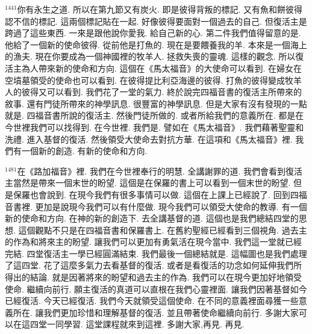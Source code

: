 \documentclass{book}
\begin{document}
$^{1441}$你有永生之道.
所以在第九節又有炭火.
即是彼得背叛的標記.
又有魚和餅彼得認不信的標記.
這兩個標記貼在一起.
好像彼得要面對一個過去的自己.
但復活主是跨過了這些東西.
一來是跟他說你愛我.
給自己新的心.
第二件我們值得留意的是.
他給了一個新的使命彼得.
從前他是打魚的.
現在是要餵養我的羊.
本來是一個海上的漁夫.
現在你要成為一個神國裡的牧羊人.
拯救失喪的靈魂.
這樣的觀念.
所以復活主為人帶來新的使命和方向.
這個在《馬太福音》的大使命可以看到.
在婦女在空墳墓領受的使命也可以看到.
在彼得提比利亞海邊的彼得.
打魚的彼得變成牧羊人的彼得又可以看到.
我們花了一堂的氣力.
終於說完四福音書的復活主所帶來的敘事.
還有門徒所帶來的神學訊息.
很豐富的神學訊息.
但是大家有沒有發現的一點就是.
四福音書所說的復活主.
然後門徒所做的.
或者所給我們的意義所在.
都是在今世裡我們可以找得到.
在今世裡.
我們是.
譬如在《馬太福音》.
我們藉著聖靈和洗禮.
進入基督的復活.
然後領受大使命去對抗方華.
在這項和《馬太福音》裡.
我們有一個新的創造.
有新的使命和方向.

$^{1481}$在《路加福音》裡.
我們在今世裡奉行的明慧.
全講謝罪的道.
我們會看到復活主當然是帶來一個末世的盼望.
這個是在保羅的書上可以看到一個末世的盼望.
但是保羅也會說到.
在現今我們有很多事情可以做.
這個在上課上已經說了.
回到四福音書裡.
更加是說現今我們可以有什麼做.
現今我們可以領受大使命的教導.
有一個新的使命和方向.
在神的新的創造下.
去全講基督的道.
這個也是我們總結四堂的思想.
這個觀點不只是在四福音書和保羅書上.
在舊約聖經已經看到三個視角.
過去主的作為和將來主的盼望.
讓我們可以更加有勇氣活在現今當中.
我們這一堂就已經完結.
四堂復活主一學已經圓滿結束.
我們最後一個總結就是.
這幅圖也是我們處理了這四堂.
花了這麼多氣力去看基督的復活.
或者是看復活的功念如何延伸我們所得出的結論.
就是因著將來的盼望和過去主的作為.
我們可以在現今更加好地領受使命.
繼續向前行.
願主復活的真道可以直根在我們心靈裡面.
讓我們因著基督如今已經復活.
今天已經復活.
我們今天就領受這個使命.
在不同的意義裡面尋獲一些意義所在.
讓我們更加珍惜和理解基督的復活.
並且帶著使命繼續向前行.
多謝大家可以在這四堂一同學習.
這堂課程就來到這裡.
多謝大家,再見.
再見.
\newpage
\end{document}
